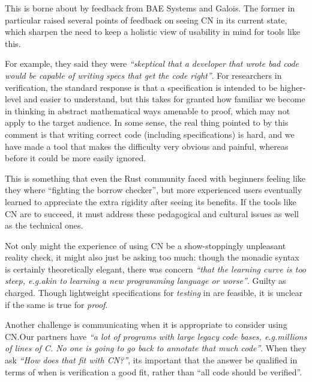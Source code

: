 This is borne about by feedback from BAE Systems and Galois. The former in
particular raised several points of feedback on seeing CN in its current state,
which sharpen the need to keep a holistic view of usability in mind for tools
like this.

For example, they said they were \emph{``skeptical that a developer that wrote
bad code would be capable of writing specs that get the code right''}. For
researchers in verification, the standard response is that a specification is
intended to be higher-level and easier to understand, but this takes for
granted how familiar we become in thinking in abstract mathematical ways
amenable to proof, which may not apply to the target audience. In some sense,
the real thing pointed to by this comment is that writing correct code
(including specifications) is hard, and we have made a tool that makes the
difficulty very obvious and painful, whereas before it could be more easily
ignored.

This is something that even the Rust community faced with beginners feeling
like they where ``fighting the borrow checker'', but more experienced users
eventually learned to appreciate the extra rigidity after seeing its benefits.
If the tools like CN are to succeed, it must address these pedagogical and
cultural issues as well as the technical ones.

Not only might the experience of using CN be a show-stoppingly unpleasant
reality check, it might also just be asking too much: though the monadic syntax
is certainly theoretically elegant, there was concern \emph{``that the learning
curve is too steep, e.g.\@ akin to learning a new programming language or
worse''}. Guilty as charged. Though lightweight specifications for
\emph{testing} in  are feasible, it is unclear if the same is true for
\emph{proof}.


Another challenge is communicating when it is appropriate to consider using
CN.\@ Our partners have \emph{``a lot of programs with large legacy code bases,
e.g.\@ millions of lines of C.  No one is going to go back to annotate that
much code''}. When they ask \emph{``How does that fit with CN?''}, its
important that the answer be qualified in terms of when is verification a good
fit, rather than ``all code should be verified''.

